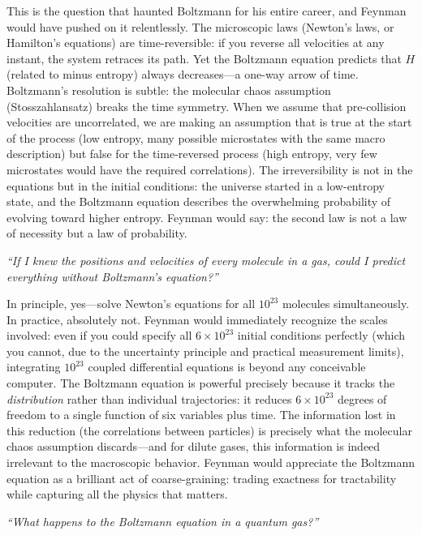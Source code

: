 \documentclass[11pt,openright]{book}
\begin{document}
This is the question that haunted Boltzmann for his entire career, and Feynman would have pushed on it relentlessly. The microscopic laws (Newton's laws, or Hamilton's equations) are time-reversible: if you reverse all velocities at any instant, the system retraces its path. Yet the Boltzmann equation predicts that $H$ (related to minus entropy) always decreases---a one-way arrow of time. Boltzmann's resolution is subtle: the molecular chaos assumption (Stosszahlansatz) breaks the time symmetry. When we assume that pre-collision velocities are uncorrelated, we are making an assumption that is true at the start of the process (low entropy, many possible microstates with the same macro description) but false for the time-reversed process (high entropy, very few microstates would have the required correlations). The irreversibility is not in the equations but in the initial conditions: the universe started in a low-entropy state, and the Boltzmann equation describes the overwhelming probability of evolving toward higher entropy. Feynman would say: the second law is not a law of necessity but a law of probability.

\textit{``If I knew the positions and velocities of every molecule in a gas, could I predict everything without Boltzmann's equation?''}

In principle, yes---solve Newton's equations for all $10^{23}$ molecules simultaneously. In practice, absolutely not. Feynman would immediately recognize the scales involved: even if you could specify all $6\times 10^{23}$ initial conditions perfectly (which you cannot, due to the uncertainty principle and practical measurement limits), integrating $10^{23}$ coupled differential equations is beyond any conceivable computer. The Boltzmann equation is powerful precisely because it tracks the \emph{distribution} rather than individual trajectories: it reduces $6\times 10^{23}$ degrees of freedom to a single function of six variables plus time. The information lost in this reduction (the correlations between particles) is precisely what the molecular chaos assumption discards---and for dilute gases, this information is indeed irrelevant to the macroscopic behavior. Feynman would appreciate the Boltzmann equation as a brilliant act of coarse-graining: trading exactness for tractability while capturing all the physics that matters.

\textit{``What happens to the Boltzmann equation in a quantum gas?''}
\end{document}
